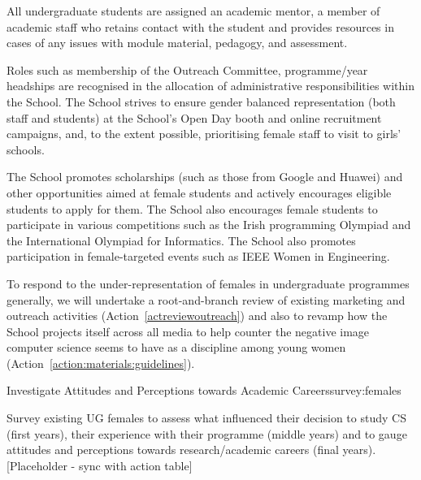 

All undergraduate students are assigned an academic mentor, a member of 
academic staff who retains contact with the student and provides resources 
in cases of any issues with module material, pedagogy, and assessment.

Roles such as membership of the Outreach Committee, programme/year
headships are recognised in the allocation of administrative 
responsibilities within the School. The School strives to ensure 
gender balanced  representation (both staff and students) at the 
School's Open Day booth and online recruitment campaigns, and, to
the extent possible,  prioritising female staff to visit to girls' 
schools.

The School promotes scholarships (such as those from Google and Huawei)
and other opportunities aimed at female students and 
actively encourages eligible students to apply for them. The School 
also encourages female students to participate in various competitions 
such as the Irish programming Olympiad and the International Olympiad 
for Informatics.  The School also promotes participation in  
female-targeted events such as IEEE Women in Engineering.

To respond to the under-representation of females in
undergraduate programmes generally, we will  undertake a 
root-and-branch review of existing marketing and outreach
activities (Action~\ref{actreviewoutreach})
and also to revamp how the School projects
itself across all media to help counter the negative image
computer science seems to have as a discipline  among young
women (Action~\ref{action:materials:guidelines}).


\newcommand{\actreviewoutreach}{
Review existing  marketing, outreach, engagement and support  activities 
to assess effectiveness and reconfigure to better encourage female school 
leavers to choose CS and improve the experience of those that  do.
[Placeholder  - sync with action table]
}

\newcommand{\actsurveyfemales}{
Survey existing UG females to assess what influenced their decision to study 
CS (first years), their experience with their programme (middle years) and 
to gauge attitudes and perceptions towards  research/academic careers 
(final years).
[Placeholder  - sync with action table]}
\begin{actionblock}{\ksspace{}Investigate Attitudes and Perceptions 
towards Academic Careers}{survey:females}
\actsurveyfemales
\hfill{
    \hypersetup{hidelinks}
    \hyperlink{b0}{\gotoactionsymbol{}}
}
\end{actionblock}


